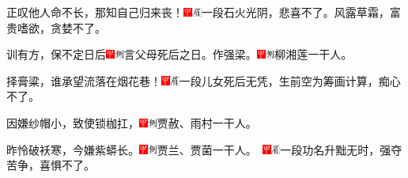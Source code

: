 正叹他人命不长，那知自己归来丧！{\includegraphics[width=3mm]{../Images/00002}\includegraphics[width=3mm]{../Images/00010}\footnotesize \kaishu 一段石火光阴，悲喜不了。风露草霜，富贵嗜欲，贪婪不了。}

训有方，保不定日后{\includegraphics[width=3mm]{../Images/00002}\includegraphics[width=3mm]{../Images/00011}\footnotesize \kaishu 言父母死后之日。}作强梁。{\includegraphics[width=3mm]{../Images/00002}\includegraphics[width=3mm]{../Images/00011}\footnotesize \kaishu 柳湘莲一干人。}

择膏粱，谁承望流落在烟花巷！{\includegraphics[width=3mm]{../Images/00002}\includegraphics[width=3mm]{../Images/00010}\footnotesize \kaishu 一段儿女死后无凭，生前空为筹画计算，痴心不了。}

因嫌纱帽小，致使锁枷扛，{\includegraphics[width=3mm]{../Images/00002}\includegraphics[width=3mm]{../Images/00011}\footnotesize \kaishu 贾赦、雨村一干人。}

昨怜破袄寒，今嫌紫蟒长。{\includegraphics[width=3mm]{../Images/00002}\includegraphics[width=3mm]{../Images/00011}\footnotesize \kaishu 贾兰、贾菌一干人。　\includegraphics[width=3mm]{../Images/00002}\includegraphics[width=3mm]{../Images/00010}\footnotesize \kaishu 一段功名升黜无时，强夺苦争，喜惧不了。}

